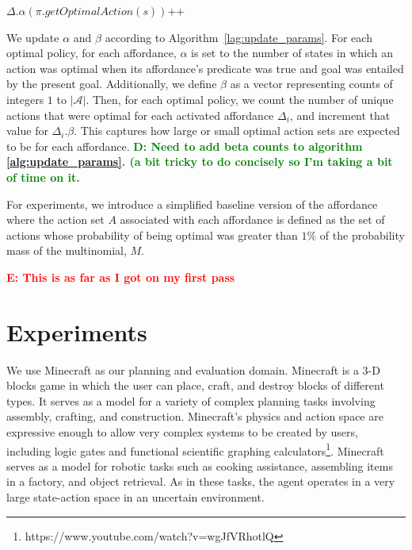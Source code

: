 \documentclass[conference]{IEEEtran}
\newcommand{\dnote}[1]{\textcolor{Green}{\textbf{D: #1}}}
\newcommand{\enote}[1]{\textcolor{Red}{\textbf{E: #1}}}
\begin{document}
\begin{algorithm}
  \caption{$updateParameters(knowledgeBase, \pi)$}
  \begin{algorithmic}[1]
    \State $\Delta.\alpha(\pi.getOptimalAction(s))$++
    \EndIf
    \EndFor
    \EndFor
  \end{algorithmic}
  \label{alg:update_params}
\end{algorithm}

We update $\alpha$ and $\beta$ according to Algorithm~\ref{lag:update_params}.
For each optimal policy, for each affordance, $\alpha$ is set to the number of states in which an action was optimal
when its affordance's predicate was true and goal was entailed by the present goal.
Additionally, we define $\beta$ as a vector representing counts of
integers $1$ to $|\mathcal{A}|$. Then, for each optimal policy, we
count the number of unique actions that were optimal for each
activated affordance $\Delta_i$, and increment that value for
$\Delta_i.\beta$. This captures how large or small optimal action sets
are expected to be for each affordance. \dnote{Need to add beta 
counts to algorithm \ref{alg:update_params}. (a bit tricky to do concisely so I'm taking a bit of time on it.}

For experiments, we introduce a simplified baseline version of the affordance where
the action set $A$ associated with each affordance is defined
as the set of actions whose probability of being optimal was greater than $1\%$
of the probability mass of the multinomial, $M$.

\enote{This is as far as I got on my first pass}

\section{Experiments}
\label{sec:experiments}

We use Minecraft as our planning and evaluation domain. Minecraft is a
 3-D blocks game in which the user can place, craft, and destroy blocks
 of different types. It serves as a model for a variety of complex planning tasks involving 
 assembly, crafting, and construction.  Minecraft's physics and action space are expressive
 enough to allow very complex systems to be created by users, including logic gates and 
 functional scientific graphing calculators\footnote{https://www.youtube.com/watch?v=wgJfVRhotlQ}.
 Minecraft serves as a model for robotic tasks such as cooking assistance, assembling items in a factory, 
 and object retrieval.  As in these tasks, the agent operates in a very large state-action space in an uncertain environment.
\end{document}
